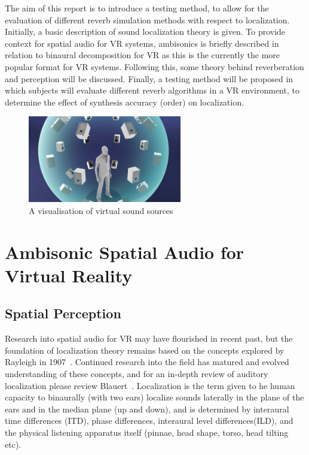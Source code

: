 \documentclass[paper=a4, fontsize=10pt, font=arial]{scrartcl} %
\numberwithin{equation}{section} %
\numberwithin{figure}{section} %
\numberwithin{table}{section} %
\begin{document}
The aim of this report is to introduce a testing method, to allow for the evaluation of different reverb simulation methods with respect to localization. 
Initially, a basic description of sound localization theory is given. 
To provide context for spatial audio for VR systems, ambisonics is briefly described in relation to binaural decomposition for VR as this is the currently the more popular format for VR systems. 
Following this, some theory behind reverberation and perception will be discussed.
Finally, a testing method will be proposed in which subjects will evaluate different reverb algorithms in a VR environment, to determine the effect of synthesis accuracy (order) on localization.

\begin{figure}[H]
\centering
\includegraphics[width=0.6\textwidth]{googlevirtualsoundsources.jpg}
\centering
\caption{A visualisation of virtual sound sources ~\cite{googlevr2016}}
\end{figure}

\newpage

\section{Ambisonic Spatial Audio for Virtual Reality}
\subsection{Spatial Perception}

Research into spatial audio for VR may have flourished in recent past, but the foundation of localization theory remains based on the concepts explored by Rayleigh in 1907~\cite{Blauert1997}. Continued research into the field has matured and evolved understanding of these concepts, and for an in-depth review of auditory localization please review Blauert~\cite{Blauert1997}. Localization is the term given to he human capacity to binaurally (with two ears) localize sounds laterally in the plane of the ears and in the median plane (up and down), and is determined by interaural time differences (ITD), phase differences, interaural level differences(ILD), and the physical listening apparatus itself (pinnae, head shape, torso, head tilting etc).
\end{document}
